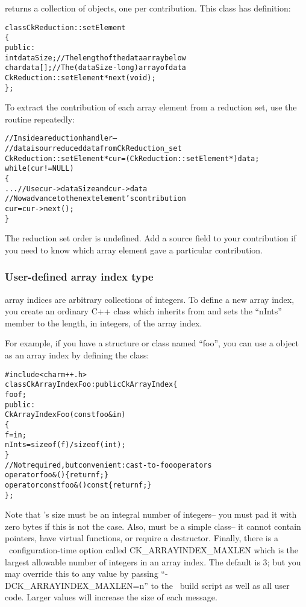  returns a collection of 
objects, one per contribution.  This class has definition:

\begin{alltt}
class CkReduction::setElement 
\{
public:
  int dataSize;//The length of the data array below
  char data[];//The (dataSize-long) array of data
  CkReduction::setElement *next(void);
\};
\end{alltt}

To extract the contribution of each array element from a reduction set, use the
 routine repeatedly:

\begin{alltt}
  //Inside a reduction handler-- 
  //  data is our reduced data from CkReduction_set
  CkReduction::setElement *cur=(CkReduction::setElement *)data;
  while (cur!=NULL)
  \{
    ... //Use cur->dataSize and cur->data
    //Now advance to the next element's contribution
    cur=cur->next();
  \}
\end{alltt}

The reduction set order is undefined.  Add a source field to your contribution
if you need to know which array element gave a particular contribution.



\subsubsection{User-defined array index type}

\charmpp{} array indices are arbitrary collections of integers.
To define a new array index, you create an ordinary C++ class 
which inherits from  and sets the ``nInts'' member
to the length, in integers, of the array index.

For example, if you have a structure or class named ``foo'', you 
can use a  object as an array index by defining the class:

\begin{alltt}
#include <charm++.h>
class CkArrayIndexFoo:public CkArrayIndex \{
    foo f;
public:
    CkArrayIndexFoo(const foo \&in) 
    \{
        f=in;
        nInts=sizeof(f)/sizeof(int);
    \}
    //Not required, but convenient: cast-to-foo operators
    operator foo &() \{return f;\}
    operator const foo &() const \{return f;\}
\};
\end{alltt}

Note that 's size must be an integral number of integers--
you must pad it with zero bytes if this is not the case.
Also,  must be a simple class-- it cannot contain 
pointers, have virtual functions, or require a destructor.
Finally, there is a \charmpp\ configuration-time option called
CK\_ARRAYINDEX\_MAXLEN  
which is the largest allowable number of 
integers in an array index.  The default is 3; but you may 
override this to any value by passing ``-DCK\_ARRAYINDEX\_MAXLEN=n'' 
to the \charmpp\ build script as well as all user code. Larger 
values will increase the size of each message.

